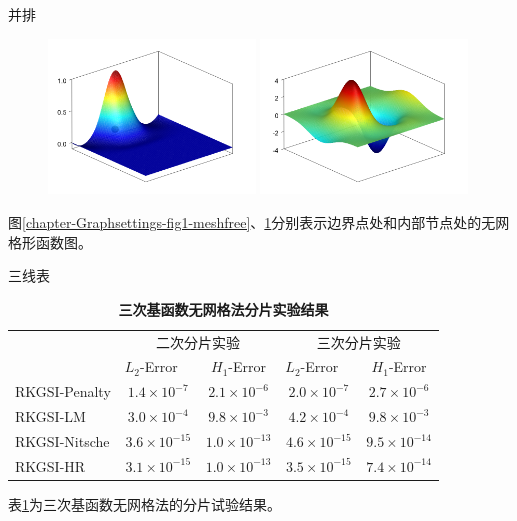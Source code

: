 \documentclass[engineeringmaster]{hquThesis}
\begin{document}
并排
\begin{figure}[H]
    \centering
    \begin{subcaptiongroup}
    \includegraphics[width=0.49\textwidth]{figure/1.png}
    \label{1}
    \includegraphics[width=0.49\textwidth]{figure/2.png}
    \label{2}
    \end{subcaptiongroup}
\caption{}


\label{chapter-Graphsettings-fig2-meshfree}
\end{figure}
图\ref{chapter-Graphsettings-fig1-meshfree}、\ref{chapter-Graphsettings-fig2-meshfree}分别表示边界点处和内部节点处的无网格形函数图。

\newpage


三线表
\begin{table}[H]
    \caption{\textbf{三次基函数无网格法分片实验结果}}
    \centering\label{chapter-table-cubic}
    \begin{tabular}{lcccc}
       \toprule
    & \multicolumn{2}{c}{二次分片实验} & \multicolumn{2}{c}{三次分片实验} \\ \cline{2-5}
       &$L_2$-Error$\quad$&$H_1$-Error&$L_2$-Error$\quad$&$H_1$-Error\\
       \midrule
      RKGSI-Penalty&$1.4\times10^{-7}$&$2.1\times10^{-6}$&$2.0\times10^{-7}$&$2.7\times10^{-6}$\\
      RKGSI-LM&$3.0\times10^{-4}$&$9.8\times10^{-3}$&$4.2\times10^{-4}$&$9.8\times10^{-3}$\\
      RKGSI-Nitsche&$3.6\times10^{-15}$&$1.0\times10^{-13}$&$4.6\times10^{-15}$&$9.5\times10^{-14}$\\
      RKGSI-HR&$3.1\times10^{-15}$&$1.0\times10^{-13}$&$3.5\times10^{-15}$&$7.4\times10^{-14}$\\
       \bottomrule
    \end{tabular}
    \end{table}
表\ref{chapter-table-cubic}为三次基函数无网格法的分片试验结果。
\end{document}
